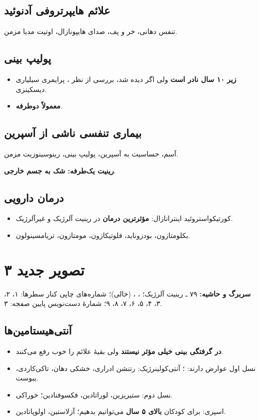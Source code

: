 \documentclass[12pt,a4paper]{article}
\begin{document}
\subsection*{علائم هایپرتروفی آدنوئید}
تنفس دهانی، خر و پف، صدای هایپونازال، اوتیت مدیا مزمن.

\subsection*{پولیپ بینی}
\begin{itemize}
\item \textbf{زیر ۱۰ سال نادر است} ولی اگر دیده شد، بررسی از نظر \textbf{}، پرایمری سیلیاری دیسکینزی.
\item \textbf{معمولاً دوطرفه}.
\end{itemize}

\subsection*{بیماری تنفسی ناشی از آسپرین}
آسم، حساسیت به آسپرین، پولیپ بینی، رینوسینوزیت مزمن.

\textbf{رینیت یک‌طرفه: شک به جسم خارجی}.

\subsection*{درمان دارویی}
\begin{itemize}
\item کورتیکواستروئید اینترانازال: \textbf{مؤثرترین درمان} در رینیت آلرژیک و غیرآلرژیک.
\item بکلومتازون، بودزوناید، فلوتیکازون، مومتازون، تریامسینولون.
\end{itemize}

\clearpage\section*{تصویر جدید ۳}
\textbf{سربرگ و حاشیه:}  ۷۹ ـ رینیت آلرژیک؛
، ،  (خالی)؛
شماره‌های چاپی کنار سطرها: ۱، ۲، ۳، ۴، ۵، ۶، ۷، ۸، ۹؛ شمارهٔ دست‌نویس پایین صفحه: ۳.

\subsection*{آنتی‌هیستامین‌ها}
\begin{itemize}
\item \textbf{در گرفتگی بینی خیلی مؤثر نیستند} ولی بقیهٔ علائم را خوب رفع می‌کنند.
\item نسل اول عوارض دارند: ؛ آنتی‌کولینرژیک: رتنشن ادراری، خشکی دهان، تاکی‌کاردی، یبوست.
\item نسل دوم: ستیریزین، لوراتادین، فکسوفنادین؛ خوراکی.
\item اسپری: برای کودکان \textbf{بالای ۵ سال} می‌توانیم بدهیم؛ آزلاستین، اولوپاتادین.
\end{itemize}
\end{document}
